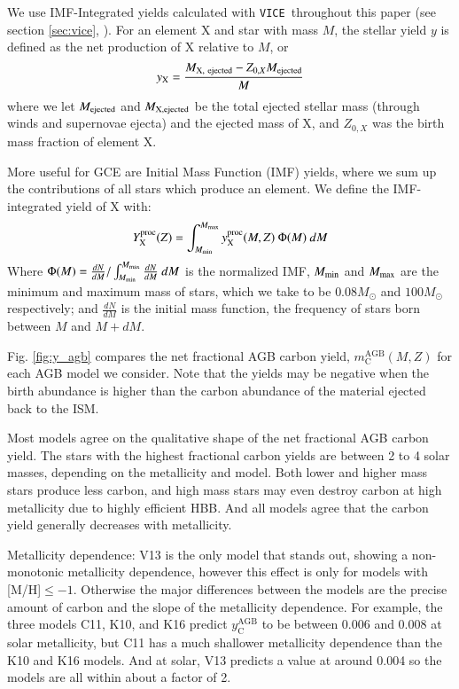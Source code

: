 \documentclass[12pt,oneside]{report}
\newcommand{\VICE}{\texttt{VICE}}
\newcommand{\sun}{\ensuremath{\odot}}
\begin{document}
We use IMF-Integrated yields calculated with \VICE~throughout this paper (see
section \ref{sec:vice}, \citet{james+21, james+22}). For an element X and star
with mass $M$, the stellar yield $y$ is defined as the net production of X relative 
to $M$, or
\begin{equation}
    y_{\rm X} = \frac{M_{\rm X,\ ejected} - Z_{0, X} M_{\rm ejected}}{M}   
\end{equation}
where we let $M_{\rm ejected}$ and $M_{\rm X, ejected}$ be the total ejected
stellar mass (through winds and supernovae ejecta) and the ejected mass of X,
and $Z_{0, X}$ was the birth mass fraction of element X.

More useful for GCE are Initial Mass Function (IMF) yields, where we sum up the
contributions of all stars which produce an element.
We define the IMF-integrated yield of X with: 
\begin{equation}
Y_{\rm X}^{\rm proc}(Z) = \int_{M_{\rm min}}^{M_{\rm max}} y_{\rm X}^{\rm proc}(M, Z)\ \Phi(M)  \ dM
\end{equation}
Where $\Phi(M) = \frac{dN}{dM}/ \int_{M_{\rm min}}^{M_{\rm max}} \frac{dN}{dM}\ dM$ is the normalized IMF, $M_{\rm min}$ and $M_{\rm max}$ are the minimum and maximum mass of stars, which we take to be $0.08 M_{\sun}$ and $100 M_{\sun}$ respectively; and $\frac{dN}{dM}$ is the initial mass function, the frequency of stars born between $M$ and $M+dM$.


Fig. \ref{fig:y_agb} compares the net fractional AGB carbon yield, $m_\text{C}^\text{AGB}(M, Z)$ for each AGB model we consider. Note that the yields may be negative when the birth abundance is higher than the carbon abundance of the material ejected back to the ISM. 

Most models agree on the qualitative shape of the net fractional AGB carbon yield. The stars with the highest fractional carbon yields are between 2 to 4 solar masses, depending on the metallicity and model. Both lower and higher mass stars produce less carbon, and high mass stars may even destroy carbon at high metallicity due to highly efficient HBB. And all models agree that the carbon yield generally decreases with metallicity. 


Metallicity dependence:
V13 is the only model that stands out, showing a non-monotonic metallicity dependence, however this effect is only for models with [M/H]$\leq -1$. Otherwise the major differences between the models are the precise amount of carbon and the slope of the metallicity dependence. For example, the three models C11, K10, and K16 predict $y_\text{C}^\text{AGB}$ to be between 0.006 and 0.008 at solar metallicity, but C11 has a much shallower metallicity dependence than the K10 and K16 models. And at solar, V13 predicts a value at around 0.004 so the models are all within about a factor of 2. 
\end{document}

